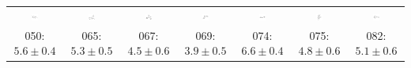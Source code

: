 \begin{tabular}{|c c c c c c c|}
\includegraphics[width = 0.14\textwidth]{2DImages/SAMPL5_002.pdf} & \includegraphics[width = 0.14\textwidth]{2DImages/SAMPL5_006.pdf} & \includegraphics[width = 0.14\textwidth]{2DImages/SAMPL5_013.pdf} & \includegraphics[width = 0.14\textwidth]{2DImages/SAMPL5_019.pdf} & \includegraphics[width = 0.14\textwidth]{2DImages/SAMPL5_024.pdf} & \includegraphics[width = 0.14\textwidth]{2DImages/SAMPL5_033.pdf} & \includegraphics[width = 0.14\textwidth]{2DImages/SAMPL5_049.pdf} \\ 
{\scriptsize 050: $ 5.6 \pm 0.4 $ } & {\scriptsize 065: $ 5.3 \pm 0.5 $ } & {\scriptsize 067: $ 4.5 \pm 0.6 $ } & {\scriptsize 069: $ 3.9 \pm 0.5 $ } & {\scriptsize 074: $ 6.6 \pm 0.4 $ } & {\scriptsize 075: $ 4.8 \pm 0.6 $ } & {\scriptsize 082: $ 5.1 \pm 0.6 $ } \\ 

\end{tabular}
